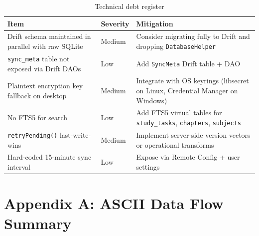 \documentclass[12pt,a4paper,openany]{report}
\begin{document}
\begin{table}[H]
\centering
\caption{Technical debt register}
\label{tab:debt}
\begin{tabular}{lll}
\toprule
\textbf{Item} & \textbf{Severity} & \textbf{Mitigation} \\
\midrule
Drift schema maintained in parallel with raw SQLite & Medium & Consider migrating fully to Drift and dropping \texttt{DatabaseHelper} \\
\texttt{sync\_meta} table not exposed via Drift DAOs & Low & Add \texttt{SyncMeta} Drift table + DAO \\
Plaintext encryption key fallback on desktop & Medium & Integrate with OS keyrings (libsecret on Linux, Credential Manager on Windows) \\
No FTS5 for search & Low & Add FTS5 virtual tables for \texttt{study\_tasks}, \texttt{chapters}, \texttt{subjects} \\
\texttt{retryPending()} last-write-wins & Medium & Implement server-side version vectors or operational transforms \\
Hard-coded 15-minute sync interval & Low & Expose via Remote Config + user settings \\
\bottomrule
\end{tabular}
\end{table}

\chapter*{Appendix A: ASCII Data Flow Summary}
\end{document}
